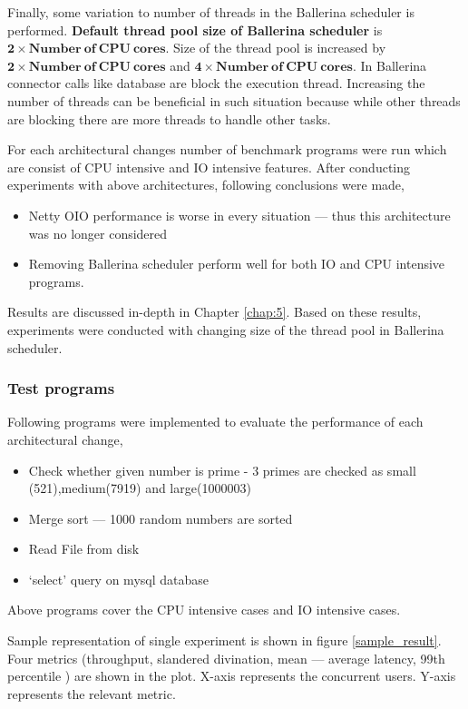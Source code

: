 Finally, some variation to number of threads in the Ballerina scheduler is performed. \textbf{Default thread pool size of Ballerina scheduler} is \textbf{$ \boldsymbol{2} \times \boldsymbol{Number\: of\: CPU\: cores}$}. Size of the thread pool is increased by \textbf{$ \boldsymbol{2} \times \boldsymbol{Number\: of\: CPU\: cores}$} and \textbf{$ \boldsymbol{4} \times \boldsymbol{Number\: of\: CPU\: cores}$}. In Ballerina connector calls like database are block the execution thread. Increasing the number of threads can be beneficial in such situation because while other threads are blocking there are more threads to handle other tasks. 

For each architectural changes number of benchmark programs were run which are consist of CPU intensive and IO intensive features.
After conducting experiments with above architectures, following conclusions were made,
 
\begin{itemize}
	\item Netty OIO performance is worse in every situation — thus this architecture was no longer considered
	\item Removing Ballerina scheduler perform well for both IO and CPU intensive programs.
\end{itemize} 

Results are discussed in-depth in Chapter \ref{chap:5}. Based on these results, experiments were conducted with changing size of the thread pool in Ballerina scheduler.

\subsubsection{Test programs}

Following programs were implemented to evaluate the performance of each architectural change,

  \begin{itemize}
  	\item Check whether given number is prime - 3 primes are checked as small (521),medium(7919) and large(1000003)
  	\item Merge sort — 1000 random numbers are sorted
  	\item Read File from disk
  	\item ‘select’ query on mysql database
  \end{itemize} 
Above programs cover the CPU intensive cases and IO intensive cases. 

Sample representation of single experiment is shown in figure \ref{sample_result}. Four metrics (throughput, slandered divination, mean — average latency, 99th percentile  ) are shown in the plot. X-axis represents the concurrent users. Y-axis represents the  relevant metric. 

